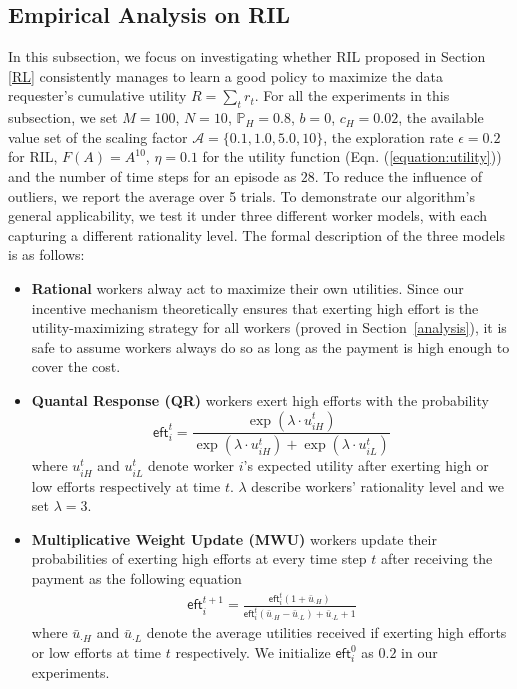 \subsection{Empirical Analysis on RIL}
In this subsection, we focus on investigating whether RIL proposed in Section \ref{RL} consistently manages to learn a good policy to maximize the data requester's cumulative utility $R=\sum_t r_t$.  For all the experiments in this subsection, we set $M=100$, $N=10$, $\mathbb{P}_H=0.8$, $b=0$, $c_H=0.02$, the available value set of the scaling factor $\mathcal{A}=\{0.1,1.0,5.0,10\}$, the exploration rate $\epsilon = 0.2$ for RIL, $F(A)=A^{10}$, $\eta=0.1$ for the utility function (Eqn. (\ref{equation:utility})) and the number of time steps for an episode as $28$. To reduce the influence of outliers, we report the average over 5 trials. To demonstrate our algorithm's general applicability, we test it under three different worker models, with each capturing a different rationality level.
The formal description of the three models is as follows:
\begin{itemize}[topsep=0pt, partopsep=0pt]
\item {\bf Rational} workers alway act to maximize their own utilities. Since our incentive mechanism theoretically ensures that exerting high effort %
is the utility-maximizing strategy for all workers (proved in Section~\ref{analysis}), it is safe to assume workers always do so as long as the payment is high enough to cover the cost.
\item {\bf Quantal Response (QR)} workers \citep{mckelvey1995quantal} exert high efforts with the probability 
$$
\textsf{eft}_i^t= \frac{\exp(\lambda\cdot  u_{iH}^t)}{\exp(\lambda \cdot u_{iH}^t) + \exp (\lambda \cdot u_{iL}^t)}
$$
where $u_{iH}^t$ and $u_{iL}^t$ denote worker $i$'s expected utility after exerting high or low efforts respectively at time $t$. $\lambda$ describe workers' rationality level and we set $\lambda =3$.

\item {\bf Multiplicative Weight Update (MWU)} workers \citep{chastain2014algorithms} update their probabilities of exerting high efforts at every time step $t$ after receiving the payment as the following equation
\begin{align*}
\textsf{eft}_i^{t+1} = \frac{\textsf{eft}_i^t(1+\bar{u}_{\cdot H})}{\textsf{eft}_i^t(\bar{u}_{\cdot H} - \bar{u}_{\cdot L}) + \bar{u}_{\cdot L} + 1}
\end{align*}
where $\bar{u}_{\cdot H}$ and $\bar{u}_{\cdot L}$ denote the average utilities received if exerting high efforts or low efforts at time $t$ respectively. We initialize $\textsf{eft}_i^0$ as $0.2$ in our experiments.
\end{itemize}

